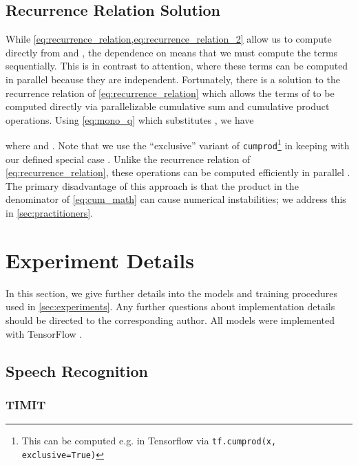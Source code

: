 \documentclass{article}
\begin{document}
\subsection{Recurrence Relation Solution}
\label{sec:recurrence}

While \cref{eq:recurrence_relation,eq:recurrence_relation_2} allow us to compute  directly from  and , the dependence on  means that we must compute the terms  sequentially.
This is in contrast to  attention, where these terms can be computed in parallel because they are independent.
Fortunately, there is a solution to the recurrence relation of \cref{eq:recurrence_relation} which allows the terms of  to be computed directly via parallelizable cumulative sum and cumulative product operations.
Using \cref{eq:mono_q} which substitutes , we have



where  and .
Note that we use the ``exclusive'' variant of \texttt{cumprod}\footnote{This can be computed e.g. in Tensorflow via \texttt{tf.cumprod(x, exclusive=True)}} in keeping with our defined special case .
Unlike the recurrence relation of \cref{eq:recurrence_relation}, these operations can be computed efficiently in parallel .
The primary disadvantage of this approach is that the product in the denominator of \cref{eq:cum_math} can cause numerical instabilities; we address this in \cref{sec:practitioners}.

\twocolumn

\section{Experiment Details}
\label{sec:experiment_details}

In this section, we give further details into the models and training procedures used in \cref{sec:experiments}.
Any further questions about implementation details should be directed to the corresponding author.
All models were implemented with TensorFlow .

\subsection{Speech Recognition}

\subsubsection{TIMIT}
\end{document}
